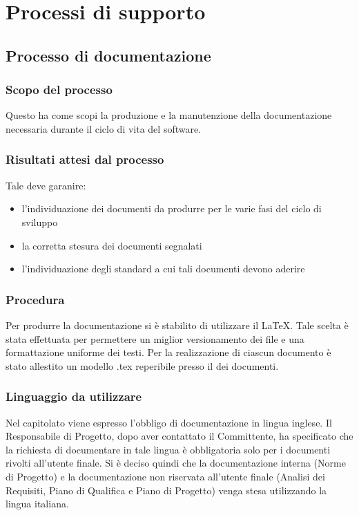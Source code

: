 \section{Processi di supporto}
\subsection{Processo di documentazione}
\subsubsection{Scopo del processo}
Questo  ha come scopi la produzione e la manutenzione della documentazione necessaria durante il ciclo di vita del software.
\subsubsection{Risultati attesi dal processo}
Tale  deve garanire:
\begin{itemize}
\item l'individuazione dei documenti da produrre per le varie fasi del ciclo di sviluppo
\item la corretta stesura dei documenti segnalati
\item l'individuazione degli standard a cui tali documenti devono aderire
\end{itemize}
  \subsubsection{Procedura}
  Per produrre la documentazione si è stabilito di utilizzare il  \LaTeX. Tale scelta è stata effettuata per permettere un miglior versionamento dei file e una formattazione uniforme dei testi.
  Per la realizzazione di ciascun documento \`e stato allestito un modello .tex reperibile presso il  dei documenti.

  \subsubsection{Linguaggio da utilizzare}
  Nel capitolato viene espresso l'obbligo di documentazione in lingua inglese. Il Responsabile di Progetto, dopo aver contattato il Committente, ha specificato che la richiesta di documentare in tale lingua è obbligatoria solo per i documenti rivolti all'utente finale. Si è deciso quindi che la documentazione interna (Norme di Progetto) e la documentazione non riservata all'utente finale (Analisi dei Requisiti, Piano di Qualifica e Piano di Progetto) venga stesa utilizzando la lingua italiana.  
  
